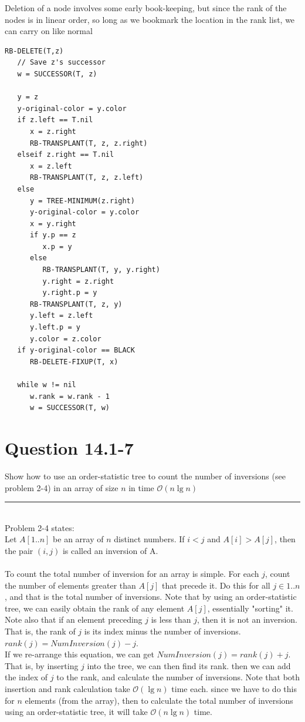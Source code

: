 \documentclass[20pt]{article} %
\begin{document}
\newpage
Deletion of a node involves some early book-keeping, but since the rank of the nodes is in linear order, so long as we bookmark the location in the rank list, we can carry on like normal
\begin{verbatim}
RB-DELETE(T,z)
   // Save z's successor
   w = SUCCESSOR(T, z)

   y = z
   y-original-color = y.color
   if z.left == T.nil
      x = z.right
      RB-TRANSPLANT(T, z, z.right)
   elseif z.right == T.nil
      x = z.left
      RB-TRANSPLANT(T, z, z.left)
   else 
      y = TREE-MINIMUM(z.right)
      y-original-color = y.color
      x = y.right
      if y.p == z
         x.p = y
      else
         RB-TRANSPLANT(T, y, y.right)
         y.right = z.right
         y.right.p = y
      RB-TRANSPLANT(T, z, y)
      y.left = z.left
      y.left.p = y
      y.color = z.color
   if y-original-color == BLACK
      RB-DELETE-FIXUP(T, x)

   while w != nil
      w.rank = w.rank - 1
      w = SUCCESSOR(T, w)

\end{verbatim}

\newpage
\section{Question 14.1-7}
Show how to use an order-statistic tree to count the number of inversions (see problem 2-4) in an array of size $n$ in time $\mathcal{O}(n \lg n)$  \\ 
\noindent\rule{2cm}{0.4pt} \\

Problem 2-4 states: \\
Let $A[1..n]$ be an array of $n$ distinct numbers. If $i < j$ and $A[i] > A[j]$, then the pair $(i,j)$ is called an inversion of A. \\ \\

To count the total number of inversion for an array is simple.  For each $j$, count the number of elements greater than $A[j]$ that precede it.  Do this for all $j \in 1..n$, and that is the total number of inversions.  Note that by using an order-statistic tree, we can easily obtain the rank of any element $A[j]$, essentially "sorting" it.  Note also that if an element preceding $j$ is less than $j$, then it is not an inversion. That is, the rank of $j$ is its index minus the number of inversions. $rank(j) = NumInversion(j) - j$. \\

If we re-arrange this equation, we can get $NumInversion(j) = rank(j) + j$. That is, by inserting $j$ into the tree, we can then find its rank. then we can add the index of $j$ to the rank, and calculate the number of inversions. Note that both insertion and rank calculation take $\mathcal{O}(\lg n)$ time each. since we have to do this for $n$ elements (from the array), then to calculate the total number of inversions using an order-statistic tree, it will take  $\mathcal{O}(n \lg n)$ time.
\end{document}
